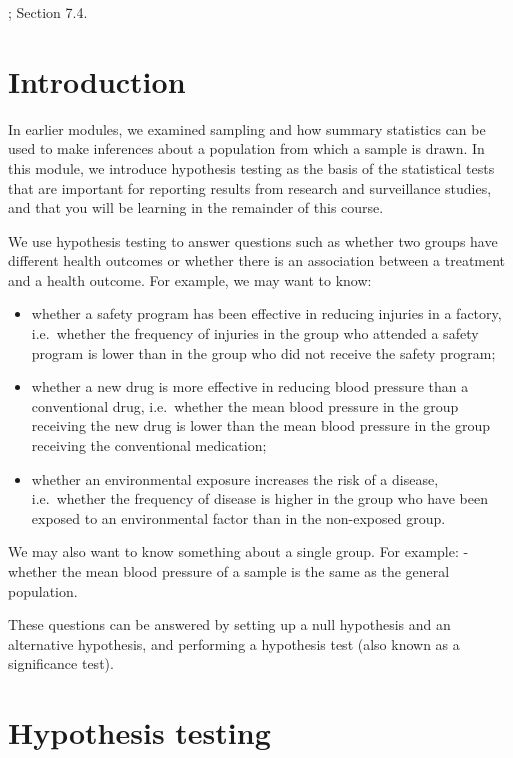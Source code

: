 \documentclass[
]{memoir}
\providecommand{\tightlist}{%
  \setlength{\itemsep}{0pt}\setlength{\parskip}{0pt}}
\begin{document}
\citet{acock10}; Section 7.4.

\hypertarget{introduction-3}{%
\section{Introduction}\label{introduction-3}}

In earlier modules, we examined sampling and how summary statistics can be used to make inferences about a population from which a sample is drawn. In this module, we introduce hypothesis testing as the basis of the statistical tests that are important for reporting results from research and surveillance studies, and that you will be learning in the remainder of this course.

We use hypothesis testing to answer questions such as whether two groups have different health outcomes or whether there is an association between a treatment and a health outcome. For example, we may want to know:

\begin{itemize}
\tightlist
\item
  whether a safety program has been effective in reducing injuries in a factory, i.e.~whether the frequency of injuries in the group who attended a safety program is lower than in the group who did not receive the safety program;
\item
  whether a new drug is more effective in reducing blood pressure than a conventional drug, i.e.~whether the mean blood pressure in the group receiving the new drug is lower than the mean blood pressure in the group receiving the conventional medication;
\item
  whether an environmental exposure increases the risk of a disease, i.e.~whether the frequency of disease is higher in the group who have been exposed to an environmental factor than in the non-exposed group.
\end{itemize}

We may also want to know something about a single group. For example:
- whether the mean blood pressure of a sample is the same as the general population.

These questions can be answered by setting up a null hypothesis and an alternative hypothesis, and performing a hypothesis test (also known as a significance test).

\hypertarget{hypothesis-testing-1}{%
\section{Hypothesis testing}\label{hypothesis-testing-1}}
\end{document}
